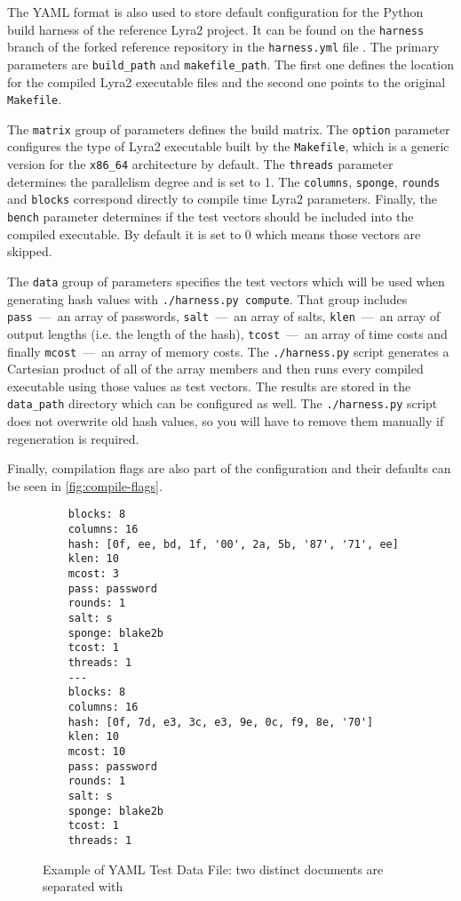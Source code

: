 The YAML format is also used to store default configuration for the Python build harness of the reference Lyra2 project. It can be found on the \texttt{harness} branch of the forked reference repository in the \texttt{harness.yml} file \cite{github:2017:lyra-copy}. The primary parameters are \texttt{build\_path} and \texttt{makefile\_path}. The first one defines the location for the compiled Lyra2 executable files and the second one points to the original \texttt{Makefile}.

The \texttt{matrix} group of parameters defines the build matrix. The \texttt{option} parameter configures the type of Lyra2 executable built by the \texttt{Makefile}, which is a generic version for the \texttt{x86\_64} architecture by default. The \texttt{threads} parameter determines the parallelism degree and is set to 1. The \texttt{columns}, \texttt{sponge}, \texttt{rounds} and \texttt{blocks} correspond directly to compile time Lyra2 parameters. Finally, the \texttt{bench} parameter determines if the test vectors should be included into the compiled executable. By default it is set to 0 which means those vectors are skipped.

The \texttt{data} group of parameters specifies the test vectors which will be used when generating hash values with \texttt{./harness.py compute}. That group includes \texttt{pass}~---~an array of passwords, \texttt{salt}~---~an array of salts, \texttt{klen}~---~an array of output lengths (i.e. the length of the hash), \texttt{tcost}~---~an array of time costs and finally \texttt{mcost}~---~an array of memory costs. The \texttt{./harness.py} script generates a Cartesian product of all of the array members and then runs every compiled executable using those values as test vectors. The results are stored in the \texttt{data\_path} directory which can be configured as well. The \texttt{./harness.py} script does not overwrite old hash values, so you will have to remove them manually if regeneration is required.

Finally, compilation flags are also part of the configuration and their defaults can be seen in \autoref{fig:compile-flags}.

\begin{figure}
    \begin{verbatim}
    blocks: 8
    columns: 16
    hash: [0f, ee, bd, 1f, '00', 2a, 5b, '87', '71', ee]
    klen: 10
    mcost: 3
    pass: password
    rounds: 1
    salt: s
    sponge: blake2b
    tcost: 1
    threads: 1
    ---
    blocks: 8
    columns: 16
    hash: [0f, 7d, e3, 3c, e3, 9e, 0c, f9, 8e, '70']
    klen: 10
    mcost: 10
    pass: password
    rounds: 1
    salt: s
    sponge: blake2b
    tcost: 1
    threads: 1
    \end{verbatim}
    \caption{Example of YAML Test Data File: two distinct documents are separated with \texttt{\-\-\-}}
    \label{fig:yaml-data}
  \end{figure}


